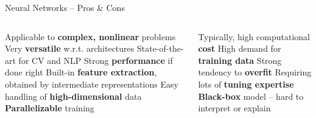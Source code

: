 \begin{frame}{Neural Networks -- Pros \& Cons}

\footnotesize

\begin{columns}[onlytextwidth]
  \begin{column}{0.5\textwidth}
    \footnotesize
    \begin{itemize}
      \positem Applicable to \textbf{complex, nonlinear} problems
      \positem Very \textbf{versatile} w.r.t. architectures
      \positem State-of-the-art for CV and NLP
      \positem Strong \textbf{performance} if done right
      \positem Built-in \textbf{feature extraction}, obtained by intermediate
      representations
      \positem Easy handling of \textbf{high-dimensional} data
      \positem \textbf{Parallelizable} training 
    \end{itemize}
  \end{column}

  \begin{column}{0.5\textwidth}
    \footnotesize
    \begin{itemize}
      \negitem Typically, high computational \textbf{cost}
      \negitem High demand for \textbf{training data} 
      \negitem Strong tendency to \textbf{overfit}
      \negitem Requiring lots of \textbf{tuning expertise} 
      \negitem \textbf{Black-box} model -- hard to interpret or explain
    \end{itemize}
  \end{column}
\end{columns}

\end{frame}